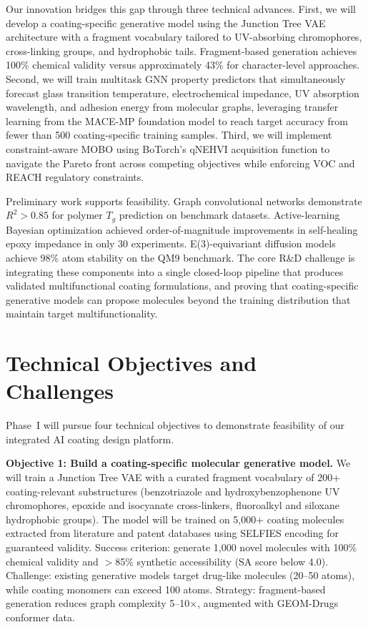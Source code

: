 \documentclass[11pt,letterpaper]{article}
\begin{document}
Our innovation bridges this gap through three technical advances. First, we will develop a coating-specific generative model using the Junction Tree VAE architecture with a fragment vocabulary tailored to UV-absorbing chromophores, cross-linking groups, and hydrophobic tails. Fragment-based generation achieves 100\% chemical validity versus approximately 43\% for character-level approaches. Second, we will train multitask GNN property predictors that simultaneously forecast glass transition temperature, electrochemical impedance, UV absorption wavelength, and adhesion energy from molecular graphs, leveraging transfer learning from the MACE-MP foundation model to reach target accuracy from fewer than 500 coating-specific training samples. Third, we will implement constraint-aware MOBO using BoTorch's qNEHVI acquisition function to navigate the Pareto front across competing objectives while enforcing VOC and REACH regulatory constraints.

Preliminary work supports feasibility. Graph convolutional networks demonstrate $R^2 > 0.85$ for polymer $T_g$ prediction on benchmark datasets. Active-learning Bayesian optimization achieved order-of-magnitude improvements in self-healing epoxy impedance in only 30 experiments. E(3)-equivariant diffusion models achieve 98\% atom stability on the QM9 benchmark. The core R\&D challenge is integrating these components into a single closed-loop pipeline that produces validated multifunctional coating formulations, and proving that coating-specific generative models can propose molecules beyond the training distribution that maintain target multifunctionality.


\section{Technical Objectives and Challenges}

Phase~I will pursue four technical objectives to demonstrate feasibility of our integrated AI coating design platform.

\textbf{Objective 1: Build a coating-specific molecular generative model.} We will train a Junction Tree VAE with a curated fragment vocabulary of 200+ coating-relevant substructures (benzotriazole and hydroxybenzophenone UV chromophores, epoxide and isocyanate cross-linkers, fluoroalkyl and siloxane hydrophobic groups). The model will be trained on 5,000+ coating molecules extracted from literature and patent databases using SELFIES encoding for guaranteed validity. Success criterion: generate 1,000 novel molecules with 100\% chemical validity and $>$85\% synthetic accessibility (SA score below 4.0). Challenge: existing generative models target drug-like molecules (20--50 atoms), while coating monomers can exceed 100 atoms. Strategy: fragment-based generation reduces graph complexity 5--10$\times$, augmented with GEOM-Drugs conformer data.
\end{document}
